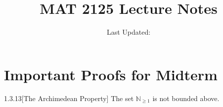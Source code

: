 \documentclass[openany]{report}
\title{MAT 2125 Lecture Notes}
\author{Last Updated:}
\begin{document}
\maketitle

\tableofcontents


\chapter*{Important Proofs for Midterm}
\label{chapter:midterm}


\begin{manualtheorem}{1.3.13}[The Archimedean Property]
    The set $\mathbb{N}_{\geq1}$ is not bounded above.
\end{manualtheorem}
    
\end{document}
